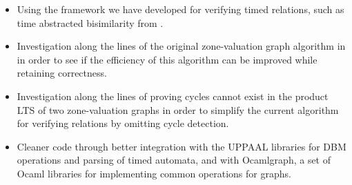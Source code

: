 \documentclass[a4paper]{llncs}
\begin{document}
\begin{itemize}
\item Using the framework we have developed for verifying timed
  relations, such as time abstracted bisimilarity from
  \cite{DBLP:conf/cav/GuhaNA12}.
\item Investigation along the lines of the original zone-valuation
  graph algorithm in \cite{DBLP:conf/cav/GuhaNA12} in order to see if the
  efficiency of this algorithm can be improved while retaining
  correctness.
\item Investigation along the lines of proving cycles cannot exist in
  the product LTS of two zone-valuation graphs in order to simplify
  the current algorithm for verifying relations by omitting cycle detection.
\item Cleaner code through better integration with the UPPAAL
  libraries for DBM operations and parsing of timed automata, and with
  Ocamlgraph, a set of Ocaml libraries for implementing common
  operations for graphs.
\end{itemize}

\appendix


  
  
  
\end{document}
